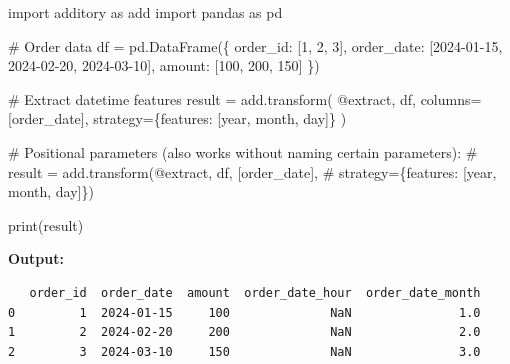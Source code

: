 \documentclass[
  letterpaper,
]{scrbook}
\newenvironment{Shaded}{\begin{snugshade}}{\end{snugshade}}
\newcommand{\BuiltInTok}[1]{\textcolor[rgb]{0.00,0.23,0.31}{#1}}
\newcommand{\CommentTok}[1]{\textcolor[rgb]{0.37,0.37,0.37}{#1}}
\newcommand{\DecValTok}[1]{\textcolor[rgb]{0.68,0.00,0.00}{#1}}
\newcommand{\ImportTok}[1]{\textcolor[rgb]{0.00,0.46,0.62}{#1}}
\newcommand{\NormalTok}[1]{\textcolor[rgb]{0.00,0.23,0.31}{#1}}
\newcommand{\OperatorTok}[1]{\textcolor[rgb]{0.37,0.37,0.37}{#1}}
\newcommand{\StringTok}[1]{\textcolor[rgb]{0.13,0.47,0.30}{#1}}
\begin{document}
\begin{Shaded}
\begin{Highlighting}[]
\ImportTok{import}\NormalTok{ additory }\ImportTok{as}\NormalTok{ add}
\ImportTok{import}\NormalTok{ pandas }\ImportTok{as}\NormalTok{ pd}

\CommentTok{\# Order data}
\NormalTok{df }\OperatorTok{=}\NormalTok{ pd.DataFrame(\{}
    \StringTok{\textquotesingle{}order\_id\textquotesingle{}}\NormalTok{: [}\DecValTok{1}\NormalTok{, }\DecValTok{2}\NormalTok{, }\DecValTok{3}\NormalTok{],}
    \StringTok{\textquotesingle{}order\_date\textquotesingle{}}\NormalTok{: [}\StringTok{\textquotesingle{}2024{-}01{-}15\textquotesingle{}}\NormalTok{, }\StringTok{\textquotesingle{}2024{-}02{-}20\textquotesingle{}}\NormalTok{, }\StringTok{\textquotesingle{}2024{-}03{-}10\textquotesingle{}}\NormalTok{],}
    \StringTok{\textquotesingle{}amount\textquotesingle{}}\NormalTok{: [}\DecValTok{100}\NormalTok{, }\DecValTok{200}\NormalTok{, }\DecValTok{150}\NormalTok{]}
\NormalTok{\})}

\CommentTok{\# Extract datetime features}
\NormalTok{result }\OperatorTok{=}\NormalTok{ add.transform(}
    \StringTok{\textquotesingle{}@extract\textquotesingle{}}\NormalTok{,}
\NormalTok{    df,}
\NormalTok{    columns}\OperatorTok{=}\NormalTok{[}\StringTok{\textquotesingle{}order\_date\textquotesingle{}}\NormalTok{],}
\NormalTok{    strategy}\OperatorTok{=}\NormalTok{\{}\StringTok{\textquotesingle{}features\textquotesingle{}}\NormalTok{: [}\StringTok{\textquotesingle{}year\textquotesingle{}}\NormalTok{, }\StringTok{\textquotesingle{}month\textquotesingle{}}\NormalTok{, }\StringTok{\textquotesingle{}day\textquotesingle{}}\NormalTok{]\}}
\NormalTok{)}

\CommentTok{\# Positional parameters (also works without naming certain parameters):}
\CommentTok{\# result = add.transform(\textquotesingle{}@extract\textquotesingle{}, df, [\textquotesingle{}order\_date\textquotesingle{}], }
\CommentTok{\#                        strategy=\{\textquotesingle{}features\textquotesingle{}: [\textquotesingle{}year\textquotesingle{}, \textquotesingle{}month\textquotesingle{}, \textquotesingle{}day\textquotesingle{}]\})}

\BuiltInTok{print}\NormalTok{(result)}
\end{Highlighting}
\end{Shaded}

\textbf{Output:}

\begin{verbatim}
   order_id  order_date  amount  order_date_hour  order_date_month
0         1  2024-01-15     100              NaN               1.0
1         2  2024-02-20     200              NaN               2.0
2         3  2024-03-10     150              NaN               3.0
\end{verbatim}
\end{document}

